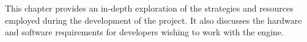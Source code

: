 
This chapter provides an in-depth exploration of the strategies and resources employed during the development of the project.
It also discusses the hardware and software requirements for developers wishing to work with the engine.
